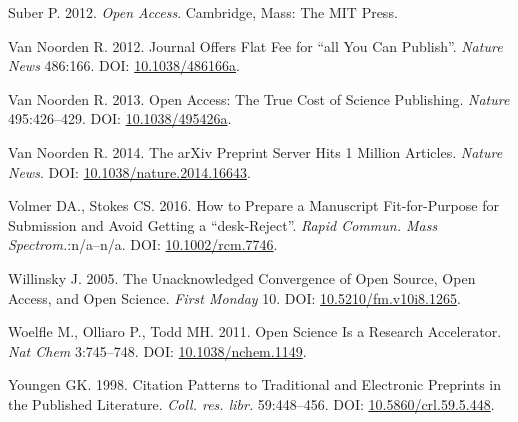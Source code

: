 \documentclass[10pt,fleqn]{wlpeerj}
\begin{document}
\hypertarget{ref-suber_open_2012}{}
Suber
P.
2012.
\emph{Open
Access}.
Cambridge,
Mass:
The
MIT
Press.

\hypertarget{ref-van_noorden_journal_2012}{}
Van
Noorden
R.
2012.
Journal
Offers
Flat
Fee
for
``all
You
Can
Publish''.
\emph{Nature
News}
486:166.
DOI:
\href{https://doi.org/10.1038/486166a}{10.1038/486166a}.

\hypertarget{ref-van_noorden_open_2013}{}
Van
Noorden
R.
2013.
Open
Access:
The
True
Cost
of
Science
Publishing.
\emph{Nature}
495:426--429.
DOI:
\href{https://doi.org/10.1038/495426a}{10.1038/495426a}.

\hypertarget{ref-van_noorden_arxiv_2014}{}
Van
Noorden
R.
2014.
The
arXiv
Preprint
Server
Hits
1
Million
Articles.
\emph{Nature
News}.
DOI:
\href{https://doi.org/10.1038/nature.2014.16643}{10.1038/nature.2014.16643}.

\hypertarget{ref-volmer_how_2016}{}
Volmer
DA.,
Stokes
CS.
2016.
How
to
Prepare
a
Manuscript
Fit-for-Purpose
for
Submission
and
Avoid
Getting
a
``desk-Reject''.
\emph{Rapid
Commun.
Mass
Spectrom.}:n/a--n/a.
DOI:
\href{https://doi.org/10.1002/rcm.7746}{10.1002/rcm.7746}.

\hypertarget{ref-willinsky_unacknowledged_2005}{}
Willinsky
J.
2005.
The
Unacknowledged
Convergence
of
Open
Source,
Open
Access,
and
Open
Science.
\emph{First
Monday}
10.
DOI:
\href{https://doi.org/10.5210/fm.v10i8.1265}{10.5210/fm.v10i8.1265}.

\hypertarget{ref-woelfle_open_2011}{}
Woelfle
M.,
Olliaro
P.,
Todd
MH.
2011.
Open
Science
Is a
Research
Accelerator.
\emph{Nat
Chem}
3:745--748.
DOI:
\href{https://doi.org/10.1038/nchem.1149}{10.1038/nchem.1149}.

\hypertarget{ref-youngen_citation_1998}{}
Youngen
GK.
1998.
Citation
Patterns
to
Traditional
and
Electronic
Preprints
in
the
Published
Literature.
\emph{Coll.
res.
libr.}
59:448--456.
DOI:
\href{https://doi.org/10.5860/crl.59.5.448}{10.5860/crl.59.5.448}.
\end{document}
